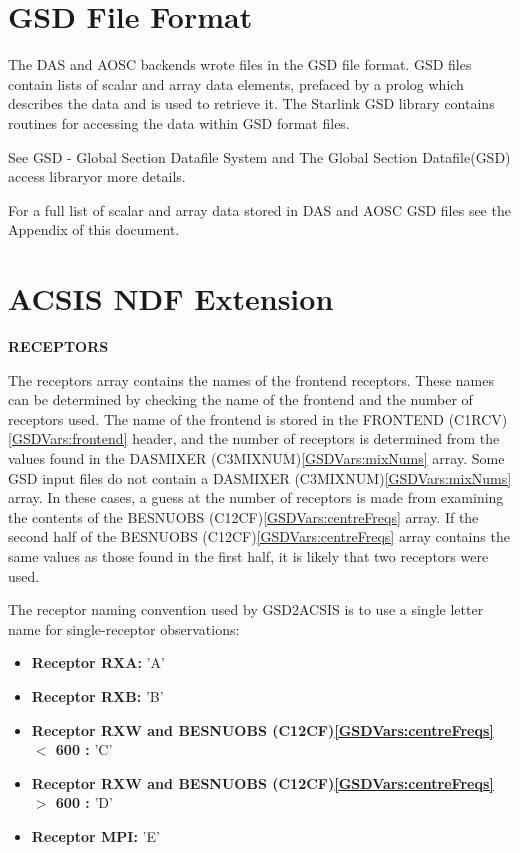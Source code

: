 \documentclass[twoside,11pt]{article}
\newcommand{\htmladdnormallink}[2]{#1}
\newcommand{\xref}[3]{#1}
\newcommand{\xlabel}[1]{}
\renewcommand{\_}{\texttt{\symbol{95}}}
\newcommand{\frontend}{FRONTEND (C1RCV)}
\newcommand{\mixNums}{DAS\_MIXER (C3MIXNUM)}
\newcommand{\centreFreqs}{BES\_NUOBS (C12CF)}
\renewcommand{\frontend}{FRONTEND (C1RCV)\ref{GSDVars:frontend}}
\renewcommand{\mixNums}{DAS\_MIXER (C3MIXNUM)\ref{GSDVars:mixNums}}
\renewcommand{\centreFreqs}{BES\_NUOBS (C12CF)\ref{GSDVars:centreFreqs}}
\begin{document}
\section{\xlabel{GSD_file_format}GSD File Format}
The DAS and AOSC backends wrote files in the GSD file format.  GSD files contain lists of scalar and array data elements, prefaced by a prolog which describes the data and is used to retrieve it.  The Starlink GSD library contains routines for accessing the data within GSD format files.

See \htmladdnormallink{GSD - Global Section Datafile System}{http://docs.jach.hawaii.edu/JCMT/MT/IN/033/mtin033.txt} and \xref{The Global Section Datafile(GSD) access library}{sun229} for more details.

For a full list of scalar and array data stored in DAS and AOSC GSD files see the Appendix of this document.

\section{\xlabel{ACSIS_extension}ACSIS NDF Extension}

{\bf RECEPTORS}

The receptors array contains the names of the frontend receptors.  These names can be determined by checking the name of the frontend and the number of receptors used.  The name of the frontend is stored in the \frontend{} header, and the number of receptors is determined from the values found in the \mixNums{} array.  Some GSD input files do not contain a \mixNums{} array.  In these cases, a guess at the number of receptors is made from examining the contents of the \centreFreqs{} array.  If the second half of the \centreFreqs{} array contains the same values as those found in the first half, it is likely that two receptors were used.

The receptor naming convention used by GSD2ACSIS is to use a single letter name for single-receptor observations:

\begin{itemize}
\item {\bf Receptor RXA:} 'A'
\item {\bf Receptor RXB:} 'B'
\item {\bf Receptor RXW and \centreFreqs{} $<$ 600 :} 'C'
\item {\bf Receptor RXW and \centreFreqs{} $>$ 600 :} 'D'
\item {\bf Receptor MPI:} 'E'
\end{itemize}
\end{document}

